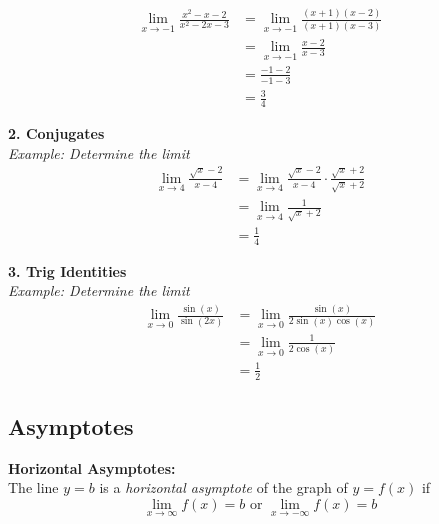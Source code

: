         \begin{align*}
            \lim_{x\to -1}\frac{x^2-x-2}{x^2-2x-3} &= \lim_{x\to -1}\frac{(x+1)(x-2)}{(x+1)(x-3)} \\
            &= \lim_{x\to -1}\frac{x-2}{x-3} \\
            &= \frac{-1-2}{-1-3} \\
            &= \frac{3}{4}
        \end{align*}

        \noindent \color{purple} \textbf{2. Conjugates} \color{blue} \\
        \textit{Example: Determine the limit} \color{black} \\
        \begin{align*}
            \lim_{x\to 4}\frac{\sqrt{x}-2}{x-4}
            &= \lim_{x\to 4}\frac{\sqrt{x}-2}{x-4}\cdot\frac{\sqrt{x}+2}{\sqrt{x}+2} \\
            &= \lim_{x\to 4}\frac{1}{\sqrt{x}+2} \\
            &= \frac{1}{4}
        \end{align*}

        \pagebreak
        \noindent \color{purple} \textbf{3. Trig Identities} \color{blue} \\
        \textit{Example: Determine the limit} \color{black} \\
        \begin{align*}
            \lim_{x\to 0} \frac{\sin{(x)}}{\sin{(2x)}}
            &= \lim_{x\to 0} \frac{\sin{(x)}}{2\sin{(x)}\cos{(x)}} \\
            &= \lim_{x\to 0} \frac{1}{2\cos{(x)}} \\
            &= \frac{1}{2}
        \end{align*}



    \subsection{Asymptotes}
        \color{purple} \textbf{Horizontal Asymptotes:} \color{black} \\
        \noindent The line $y=b$ is a \textit{horizontal asymptote} of the graph of $y=f(x)$ if \\

        \begin{equation*}
            \lim_{x\to\infty}f(x)=b\text{ or }\lim_{x\to-\infty}f(x)=b
        \end{equation*}

